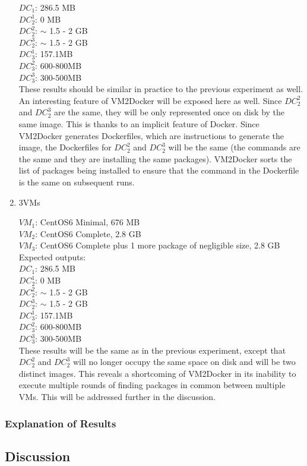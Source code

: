\begin{enumerate}
$DC_1$: 286.5 MB\\
$DC_2^1$: 0 MB\\
$DC_2^2$: $\sim$ 1.5 - 2 GB\\
$DC_2^3$: $\sim$ 1.5 - 2 GB\\
$DC_3^1$: 157.1MB\\
$DC_3^2$: 600-800MB\\
$DC_3^3$: 300-500MB\\

These results should be similar in practice to the previous experiment as well. An interesting feature of VM2Docker will be exposed here as well. Since $DC_2^2$ and $DC_2^3$ are the same, they will be only represented once on disk by the same image. This is thanks to an implicit feature of Docker. Since VM2Docker generates Dockerfiles, which are instructions to generate the image, the Dockerfiles for $DC_2^2$ and $DC_2^3$ will be the same (the commands are the same and they are installing the same packages). VM2Docker sorts the list of packages being installed to ensure that the command in the Dockerfile is the same on subsequent runs. 
\item 3VMs

$VM_1$: CentOS6 Minimal, 676 MB\\
$VM_2$: CentOS6 Complete, 2.8 GB\\
$VM_3$: CentOS6 Complete plus 1 more package of negligible size, 2.8 GB\\

Expected outputs:\\

$DC_1$: 286.5 MB\\
$DC_2^1$: 0 MB\\
$DC_2^2$: $\sim$ 1.5 - 2 GB\\
$DC_2^3$: $\sim$ 1.5 - 2 GB\\
$DC_3^1$: 157.1MB\\
$DC_3^2$: 600-800MB\\
$DC_3^3$: 300-500MB\\

These results will be the same as in the previous experiment, except that $DC_2^2$ and $DC_2^3$ will no longer occupy the same space on disk and will be two distinct images. This reveals a shortcoming of VM2Docker in its inability to execute multiple rounds of finding packages in common between multiple VMs. This will be addressed further in the discussion.
\end{enumerate}

\subsubsection{Explanation of Results}


\subsection{Discussion}




